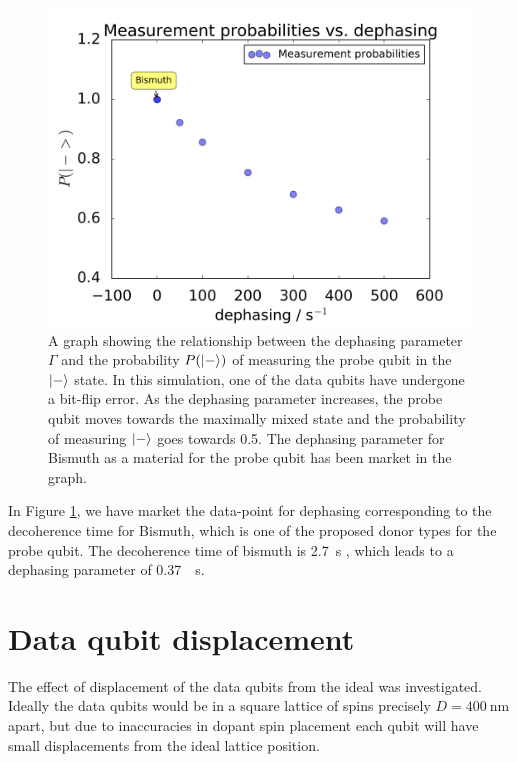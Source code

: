 \begin{figure}[!ht]
	\centering
	\includegraphics[width=\textwidth]{Figures/phase_graph.png}
		\caption{A graph showing the relationship between the dephasing parameter $\Gamma$ and the probability $P(\ket{-})$ of measuring the probe qubit in the $\ket{-}$ state. In this simulation, one of the data qubits have undergone a bit-flip error. As the dephasing parameter increases, the probe qubit moves towards the maximally mixed state and the probability of measuring $\ket{-}$ goes towards 0.5. The dephasing parameter for Bismuth as a material for the probe qubit has been market in the graph.}
		\label{fig:phaseplot}
\end{figure}


In Figure \ref{fig:phaseplot}, we have market the data-point for dephasing corresponding to the decoherence time for Bismuth, which is one of the proposed donor types for the probe qubit. The decoherence time of bismuth is \SI{2.7}{\second} \cite{Wolfowicz2013}, which leads to a dephasing parameter of \SI{0.37}{\per\second}. 


\section{Data qubit displacement}
The effect of displacement of the data qubits from the ideal was investigated. Ideally the data qubits would be in a square lattice of spins precisely $D = \SI{400}{\nano\metre}$ apart, but due to inaccuracies in dopant spin placement each qubit will have small displacements from the ideal lattice position.

